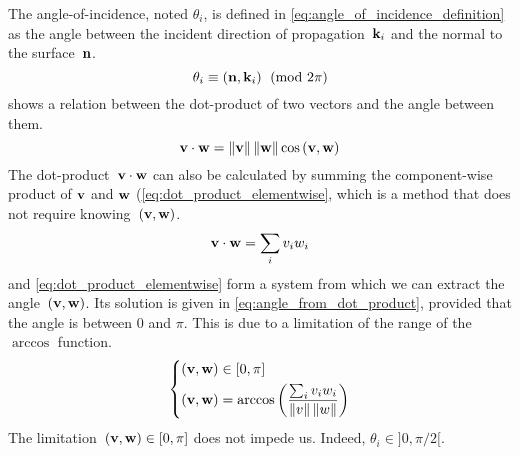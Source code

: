 The angle-of-incidence, noted $\theta_i$, is defined in \cref{eq:angle_of_incidence_definition} as the angle between the incident direction of propagation~$\mathbf{k}_i$ and the normal to the surface~$\mathbf{n}$.
\begin{equation}
    \theta_i \equiv \left(\mathbf{n}, \mathbf{k}_i\right) \pmod{2\pi}
    \label{eq:angle_of_incidence_definition}
\end{equation}
 shows a relation between the dot-product of two vectors and the angle between them.
\begin{equation}
    \mathbf{v} \cdot \mathbf{w} = \left\| \mathbf{v} \right\| \left\| \mathbf{w} \right\| \cos \left(\mathbf{v}, \mathbf{w}\right)
    \label{eq:dot_product_cos}
\end{equation}
The dot-product~$\mathbf{v} \cdot \mathbf{w}$ can also be calculated by summing the component-wise product of $\mathbf{v}$ and $\mathbf{w}$ (\cref{eq:dot_product_elementwise}, which is a method that does not require knowing~$\left(\mathbf{v}, \mathbf{w}\right)$.
\begin{equation}
    \mathbf{v} \cdot \mathbf{w} = \sum_i v_i w_i
    \label{eq:dot_product_elementwise}
\end{equation}
 and \cref{eq:dot_product_elementwise} form a system from which we can extract the angle~$\left(\mathbf{v}, \mathbf{w}\right)$.
Its solution is given in \cref{eq:angle_from_dot_product}, provided that the angle is between 0 and $\pi$.
This is due to a limitation of the range of the $\arccos$ function.
\begin{equation}
    \left\lbrace
        \begin{aligned}
            \left(\mathbf{v}, \mathbf{w}\right) &\in [0, \pi]
            \\
            \left(\mathbf{v}, \mathbf{w}\right) &= \arccos
            \left(
                \frac{
                    \sum_i v_i w_i
                }{
                    \left\| v \right\| \left\| w \right\|
                }
            \right)
        \end{aligned}
    \right.
    \label{eq:angle_from_dot_product}
\end{equation}
The limitation~$\left(\mathbf{v}, \mathbf{w}\right) \in [0, \pi]$ does not impede us.
Indeed, $\theta_i \in ]0, \pi/2[$.
